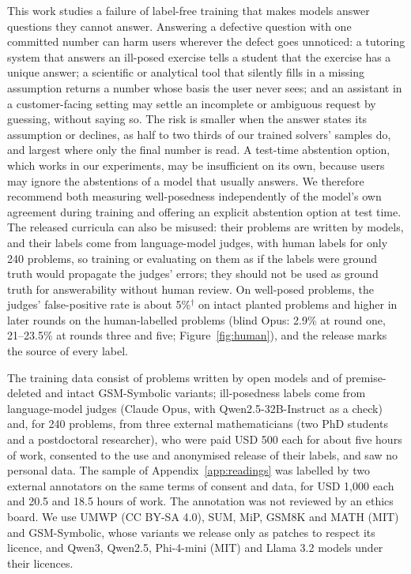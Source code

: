 This work studies a failure of label-free training that makes models answer questions they cannot answer. Answering a defective question with one committed number can harm users wherever the defect goes unnoticed: a tutoring system that answers an ill-posed exercise tells a student that the exercise has a unique answer; a scientific or analytical tool that silently fills in a missing assumption returns a number whose basis the user never sees; and an assistant in a customer-facing setting may settle an incomplete or ambiguous request by guessing, without saying so. The risk is smaller when the answer states its assumption or declines, as half to two thirds of our trained solvers' samples do, and largest where only the final number is read. A test-time abstention option, which works in our experiments, may be insufficient on its own, because users may ignore the abstentions of a model that usually answers. We therefore recommend both measuring well-posedness independently of the model's own agreement during training and offering an explicit abstention option at test time. The released curricula can also be misused: their problems are written by models, and their labels come from language-model judges, with human labels for only 240 problems, so training or evaluating on them as if the labels were ground truth would propagate the judges' errors; they should not be used as ground truth for answerability without human review. On well-posed problems, the judges' false-positive rate is about 5\%$^{\dagger}$ on intact planted problems and higher in later rounds on the human-labelled problems (blind Opus: 2.9\% at round one, 21--23.5\% at rounds three and five; Figure~\ref{fig:human}), and the release marks the source of every label.

The training data consist of problems written by open models and of premise-deleted and intact GSM-Symbolic variants; ill-posedness labels come from language-model judges (Claude Opus, with Qwen2.5-32B-Instruct as a check) and, for 240 problems, from three external mathematicians (two PhD students and a postdoctoral researcher), who were paid USD 500 each for about five hours of work, consented to the use and anonymised release of their labels, and saw no personal data. The sample of Appendix~\ref{app:readings} was labelled by two external annotators on the same terms of consent and data, for USD 1,000 each and 20.5 and 18.5 hours of work. The annotation was not reviewed by an ethics board. We use UMWP (CC BY-SA 4.0), SUM, MiP, GSM8K and MATH (MIT) and GSM-Symbolic, whose variants we release only as patches to respect its licence, and Qwen3, Qwen2.5, Phi-4-mini (MIT) and Llama 3.2 models under their licences.
